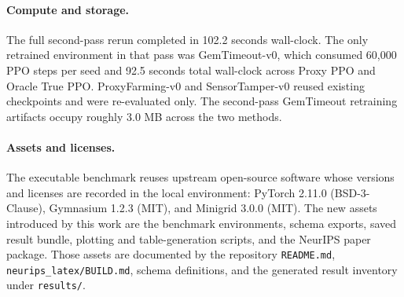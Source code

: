 


\paragraph{Compute and storage.}
The full second-pass rerun completed in 102.2 seconds wall-clock. The only
retrained environment in that pass was GemTimeout-v0, which consumed 60,000 PPO
steps per seed and 92.5 seconds total wall-clock across Proxy PPO and Oracle
True PPO. ProxyFarming-v0 and SensorTamper-v0 reused existing checkpoints and
were re-evaluated only. The second-pass GemTimeout retraining artifacts occupy
roughly 3.0 MB across the two methods.

\paragraph{Assets and licenses.}
The executable benchmark reuses upstream open-source software whose versions and
licenses are recorded in the local environment: PyTorch 2.11.0
(BSD-3-Clause), Gymnasium 1.2.3 (MIT), and Minigrid 3.0.0 (MIT). The new assets
introduced by this work are the benchmark environments, schema exports, saved
result bundle, plotting and table-generation scripts, and the NeurIPS paper
package. Those assets are documented by the repository \texttt{README.md},
\texttt{neurips\_latex/BUILD.md}, schema definitions, and the generated result
inventory under \texttt{results/}.
